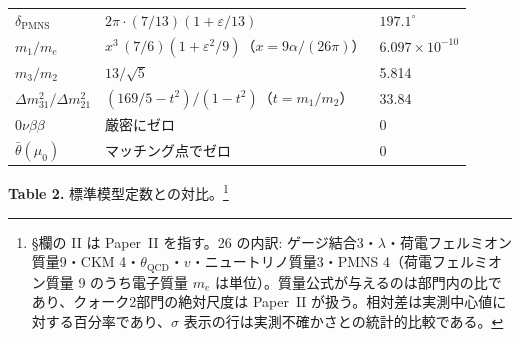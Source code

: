 \documentclass[fontsize=11pt,paper=a4,lualatex]{jlreq}
\begin{document}
\begin{center}
\begin{tabular}{@{}lll@{}}
$\delta_\mathrm{PMNS}$ & $2\pi\cdot(7/13)(1+\varepsilon/13)$ & $197.1^\circ$ \\
$m_1/m_e$ & $x^3\,(7/6)(1+\varepsilon^2/9)$（$x = 9\alpha/(26\pi)$） & $6.097 \times 10^{-10}$ \\
$m_3/m_2$ & $13/\sqrt5$ & 5.814 \\
$\Delta m^2_{31}/\Delta m^2_{21}$ & $(169/5-t^2)/(1-t^2)$（$t = m_1/m_2$） & 33.84 \\
$0\nu\beta\beta$ & 厳密にゼロ & 0 \\
$\bar\theta(\mu_0)$ & マッチング点でゼロ & 0 \\
\bottomrule
\end{tabular}
\end{center}

\bigskip
\begin{center}\textbf{Table 2.} 標準模型定数との対比。\footnote{§欄の II は Paper~II を指す。26 の内訳: ゲージ結合3・$\lambda$・荷電フェルミオン質量9・CKM 4・$\theta_\mathrm{QCD}$・$v$・ニュートリノ質量3・PMNS 4（荷電フェルミオン質量 9 のうち電子質量 $m_e$ は単位）。質量公式が与えるのは部門内の比であり、クォーク2部門の絶対尺度は Paper~II が扱う。相対差は実測中心値に対する百分率であり、$\sigma$ 表示の行は実測不確かさとの統計的比較である。}\end{center}
\nopagebreak[4]\smallskip\nopagebreak[4]
\end{document}
